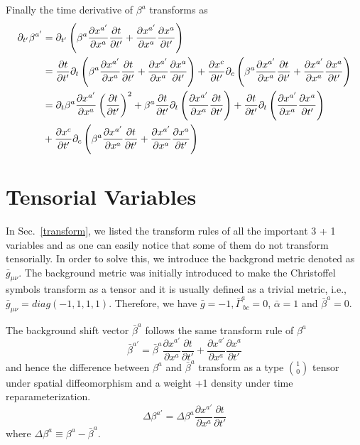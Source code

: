 \documentclass[letterpaper,nofootinbib,prd,amsmath,onecolumn]{revtex4-1}
\begin{document}
Finally the time derivative of $\beta^{a}$ transforms as
\begin{align}
\partial_{t'}\beta^{a'} & = \partial_{t'}\left(\beta^{a}\frac{\partial x^{a'}}{\partial x^{a}}\frac{\partial t}{\partial t'} + \frac{\partial x^{a'}}{\partial x^{a}}\frac{\partial x^{a}}{\partial t'}\right)\notag\\
& = \frac{\partial t}{\partial t'}\partial_{t}\left(\beta^{a}\frac{\partial x^{a'}}{\partial x^{a}}\frac{\partial t}{\partial t'} + \frac{\partial x^{a'}}{\partial x^{a}}\frac{\partial x^{a}}{\partial t'}\right) + \frac{\partial x^{c}}{\partial t'}\partial_{c}\left(\beta^{a}\frac{\partial x^{a'}}{\partial x^{a}}\frac{\partial t}{\partial t'} + \frac{\partial x^{a'}}{\partial x^{a}}\frac{\partial x^{a}}{\partial t'}\right)\notag\\
& = \partial_{t}\beta^{a}\frac{\partial x^{a'}}{\partial x^{a}}\left(\frac{\partial t}{\partial t'}\right)^{2} + \beta^{a}\frac{\partial t}{\partial t'}\partial_{t}\left(\frac{\partial x^{a'}}{\partial x^{a}}\frac{\partial t}{\partial t'}\right) + \frac{\partial t}{\partial t'}\partial_{t}\left(\frac{\partial x^{a'}}{\partial x^{a}}\frac{\partial x^{a}}{\partial t'}\right)\notag\\
& + \frac{\partial x^{c}}{\partial t'}\partial_{c}\left(\beta^{a}\frac{\partial x^{a'}}{\partial x^{a}}\frac{\partial t}{\partial t'} + \frac{\partial x^{a'}}{\partial x^{a}}\frac{\partial x^{a}}{\partial t'}\right)
\end{align}
\section{Tensorial Variables}\label{tensorial}
In Sec.~\ref{transform}, we listed the transform rules of all the important 3 + 1 variables and as one can easily notice that some of them do not transform tensorially. In order to solve this, we introduce the backgrond metric denoted as ${\bar g}_{\mu\nu}$. The background metric was initially introduced to make the Christoffel symbols transform as a tensor and it is usually defined as a trivial metric, i.e., ${\bar g}_{\mu\nu} = diag(-1,1,1,1)$. Therefore, we have ${\bar g} = -1, $${\bar \Gamma}^{a}_{~bc} = 0$, ${\bar \alpha} = 1$ and ${\bar \beta}^{a} = 0$. 

The background shift vector ${\bar \beta}^{a}$ follows the same transform rule of $\beta^{a}$
\[
{\bar \beta}^{a'} = {\bar \beta}^{a}\frac{\partial x^{a'}}{\partial x^{a}}\frac{\partial t}{\partial t'} + \frac{\partial x^{a'}}{\partial x^{a}}\frac{\partial x^{a}}{\partial t'}
\]
and hence the difference between $\beta^{a}$ and ${\bar \beta}^{a}$ transform as a type $1 \choose 0$ tensor under spatial diffeomorphism and a weight +1 density under time reparameterization. 
\begin{equation}
\Delta \beta^{a'} = \Delta \beta^{a}\frac{\partial x^{a'}}{\partial x^{a}}\frac{\partial t}{\partial t'}
\end{equation}
where $\Delta \beta^{a} \equiv \beta^{a} - {\bar \beta}^{a}$.
\end{document}
